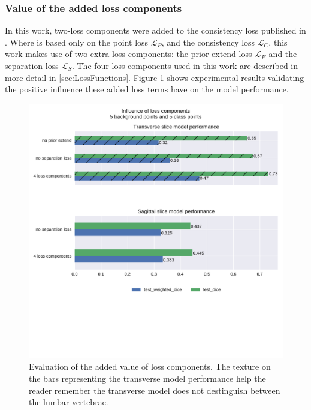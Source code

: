 \subsubsection{Value of the added loss components}
\par{
    In this work, two-loss components were added to the consistency loss published in \cite{Laradji2021}.
    Where \cite{Laradji2021} is based only on the point loss $\mathcal{L}_P$, and the consistency loss $\mathcal{L}_C$, this work makes use of two extra loss components:
    the prior extend loss $\mathcal{L}_E$ and the separation loss $\mathcal{L}_S$. The four-loss components used in this work are described in more detail in \ref{sec:LossFunctions}.
    Figure \ref{fig:addedLossComponents} shows experimental results validating the positive influence these added loss terms have on the model performance.
}
\begin{figure}
    \centering
    \includegraphics[width=.95\textwidth]{images/Losscomponents.pdf}
    \caption{Evaluation of the added value of loss components. 
    The texture on the bars representing the transverse model performance help the reader remember the transverse model does not destinguish between the lumbar vertebrae.
    \label{fig:addedLossComponents}}
\end{figure}

